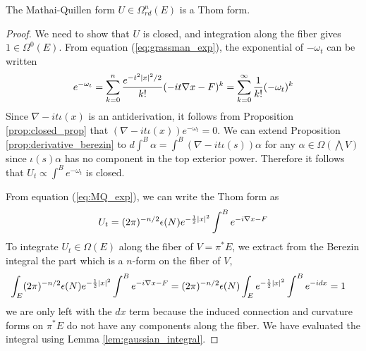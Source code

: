 \begin{thm}
	The Mathai-Quillen form $U \in \Omega^n_{rd}(E)$ is a Thom form. 
\end{thm}
\begin{proof}
	We need to show that $U$ is closed, and integration along the fiber gives $1\in
	\Omega^0(E)$.
	From equation (\ref{eq:grassman_exp}), the exponential of $-\omega_t$
	can be written 
	\begin{equation} \label{eq:MQ_exp}
		e^{-\omega_t} = \sum_{k=0}^{n} \frac{e^{-t^2\abs{x}^2 /2}}{k!} (-it\nabla x
		- F)^k 
		= \sum_{k=0}^{\infty} \frac{1}{k!} (-\omega_t)^k
	\end{equation}
	Since $\nabla - it\iota(x)$ is an antiderivation, it follows from
	Proposition \ref{prop:closed_prop} that $(\nabla-it\iota(x)) e^{-\omega_t} =
	0$. 
	We can extend Proposition \ref{prop:derivative_berezin} to 
	$d\int^B\alpha = \int^B (\nabla-it\iota(s))\alpha$ for any	
	$\alpha\in\Omega(\bigwedge V)$ since $\iota(s)\alpha$ has no component in 
	the top exterior power.	
	Therefore it follows that $U_t \propto \int^B e^{-\omega_t}$ is closed.
	
	From equation (\ref{eq:MQ_exp}), we can write the Thom form as 
	\[
	U_t = (2\pi)^{-n/2}\epsilon(N) e^{-\frac{1}{2}\abs{x}^2}\int^B e^{-i\nabla x -F}
	\] 
	To integrate $U_t \in \Omega(E)$ along the fiber of $V=\pi^*E$, we extract from
	the Berezin integral the part which is a $n$-form on the fiber of $V$,
	\begin{align*}
		\int_E (2\pi)^{-n/2}\epsilon(N) e^{-\frac{1}{2}\abs{x}^2}\int^B e^{-i\nabla x -F}
		&= (2\pi)^{-n/2}\epsilon(N) \int_E e^{-\frac{1}{2}\abs{x}^2}\int^B 
		e^{-idx}
		= 1 
	\end{align*}
	we are only left with the $dx$ term because the induced connection and
	curvature forms on  $\pi^*E$ do not have any components along the fiber.
	We have evaluated the integral using Lemma \ref{lem:gaussian_integral}.
\end{proof}

